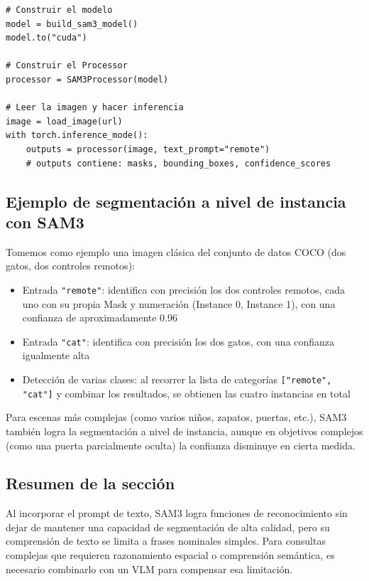 \begin{lstlisting}[caption={Ejemplo básico de uso de SAM3 (pseudocódigo)}]
# Construir el modelo
model = build_sam3_model()
model.to("cuda")

# Construir el Processor
processor = SAM3Processor(model)

# Leer la imagen y hacer inferencia
image = load_image(url)
with torch.inference_mode():
    outputs = processor(image, text_prompt="remote")
    # outputs contiene: masks, bounding_boxes, confidence_scores
\end{lstlisting}

\subsection{Ejemplo de segmentación a nivel de instancia con SAM3}

Tomemos como ejemplo una imagen clásica del conjunto de datos COCO (dos gatos, dos controles remotos):

\begin{itemize}
    \item Entrada \texttt{"remote"}: identifica con precisión los dos controles remotos, cada uno con su propia Mask y numeración (Instance 0, Instance 1), con una confianza de aproximadamente 0.96
    \item Entrada \texttt{"cat"}: identifica con precisión los dos gatos, con una confianza igualmente alta
    \item Detección de varias clases: al recorrer la lista de categorías \texttt{{[}"remote", "cat"{]}} y combinar los resultados, se obtienen las cuatro instancias en total
\end{itemize}

Para escenas más complejas (como varios niños, zapatos, puertas, etc.), SAM3 también logra la segmentación a nivel de instancia, aunque en objetivos complejos (como una puerta parcialmente oculta) la confianza disminuye en cierta medida.

\subsection{Resumen de la sección}

Al incorporar el prompt de texto, SAM3 logra funciones de reconocimiento sin dejar de mantener una capacidad de segmentación de alta calidad, pero su comprensión de texto se limita a frases nominales simples. Para consultas complejas que requieren razonamiento espacial o comprensión semántica, es necesario combinarlo con un VLM para compensar esa limitación.


